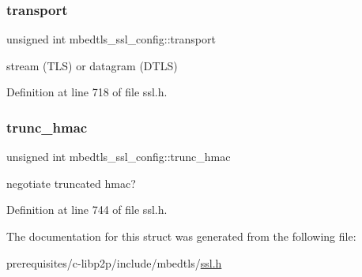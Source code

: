 \subsubsection{\texorpdfstring{transport}{transport}}
{\footnotesize\ttfamily unsigned int mbedtls\+\_\+ssl\+\_\+config\+::transport}

stream (T\+LS) or datagram (D\+T\+LS) 

Definition at line 718 of file ssl.\+h.

\mbox{\label{structmbedtls__ssl__config_a24bf9d624a2e2432518e9da8ae908db4}} 
\subsubsection{\texorpdfstring{trunc\+\_\+hmac}{trunc\_hmac}}
{\footnotesize\ttfamily unsigned int mbedtls\+\_\+ssl\+\_\+config\+::trunc\+\_\+hmac}

negotiate truncated hmac? 

Definition at line 744 of file ssl.\+h.



The documentation for this struct was generated from the following file\+:\begin{DoxyCompactItemize}
\item 
prerequisites/c-\/libp2p/include/mbedtls/\mbox{\hyperlink{ssl_8h}{ssl.\+h}}\end{DoxyCompactItemize}
